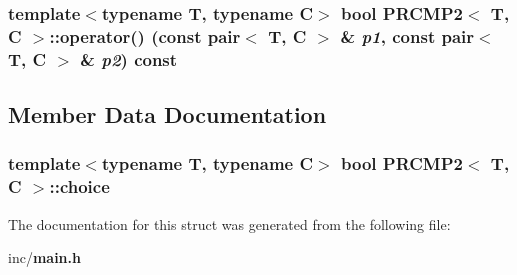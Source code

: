 \subsubsection{\setlength{\rightskip}{0pt plus 5cm}template$<$typename T, typename C$>$ bool {\bf PRCMP2}$<$ T, C $>$::operator() (const pair$<$ T, C $>$ \& {\em p1}, const pair$<$ T, C $>$ \& {\em p2}) const\hspace{0.3cm}{\tt  [inline]}}\label{structPRCMP2_1e78052b0bdbc6e84380ecccd1240cd1}




\subsection{Member Data Documentation}
\subsubsection{\setlength{\rightskip}{0pt plus 5cm}template$<$typename T, typename C$>$ bool {\bf PRCMP2}$<$ T, C $>$::{\bf choice}}\label{structPRCMP2_9032fbaff91306d33791e61d611f6797}




The documentation for this struct was generated from the following file:\begin{CompactItemize}
\item 
inc/{\bf main.h}\end{CompactItemize}

